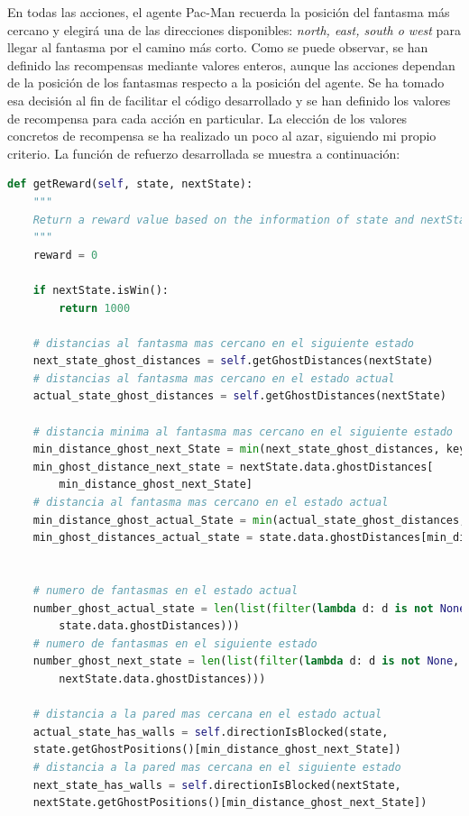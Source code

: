 \documentclass[11pt]{exam}
\begin{document}
En todas las acciones, el agente Pac-Man recuerda la posición del fantasma más cercano y elegirá una de las direcciones disponibles: \textit{north, east, south o west} para llegar al fantasma por el camino más corto. Como se puede observar, se han definido las recompensas mediante valores enteros, aunque las acciones dependan de la posición de los fantasmas respecto a la posición del agente. Se ha tomado esa decisión al fin de facilitar el código desarrollado y se han definido los valores de recompensa para cada acción en particular. La elección de los valores concretos de recompensa se ha realizado un poco al azar, siguiendo mi propio criterio. La función de refuerzo desarrollada se muestra a continuación:
\vspace*{2mm}

\begin{lstlisting}[caption={Función de refuerzo.}, label={reward}, language=python, basicstyle=\scriptsize]
def getReward(self, state, nextState):
	"""
	Return a reward value based on the information of state and nextState
	"""
	reward = 0
	
	if nextState.isWin():
		return 1000
	
	# distancias al fantasma mas cercano en el siguiente estado
	next_state_ghost_distances = self.getGhostDistances(nextState)
	# distancias al fantasma mas cercano en el estado actual
	actual_state_ghost_distances = self.getGhostDistances(nextState)
	
	# distancia minima al fantasma mas cercano en el siguiente estado
	min_distance_ghost_next_State = min(next_state_ghost_distances, key=lambda t: t[1])[0]
	min_ghost_distance_next_state = nextState.data.ghostDistances[
		min_distance_ghost_next_State]
	# distancia al fantasma mas cercano en el estado actual
	min_distance_ghost_actual_State = min(actual_state_ghost_distances, key=lambda t: t[1])[0]
	min_ghost_distances_actual_state = state.data.ghostDistances[min_distance_ghost_actual_State]
	
	
	# numero de fantasmas en el estado actual
	number_ghost_actual_state = len(list(filter(lambda d: d is not None, 
		state.data.ghostDistances)))
	# numero de fantasmas en el siguiente estado
	number_ghost_next_state = len(list(filter(lambda d: d is not None, 
		nextState.data.ghostDistances)))
	
	# distancia a la pared mas cercana en el estado actual
	actual_state_has_walls = self.directionIsBlocked(state,
	state.getGhostPositions()[min_distance_ghost_next_State])
	# distancia a la pared mas cercana en el siguiente estado
	next_state_has_walls = self.directionIsBlocked(nextState,
	nextState.getGhostPositions()[min_distance_ghost_next_State])
	

\end{lstlisting}
\end{document}
